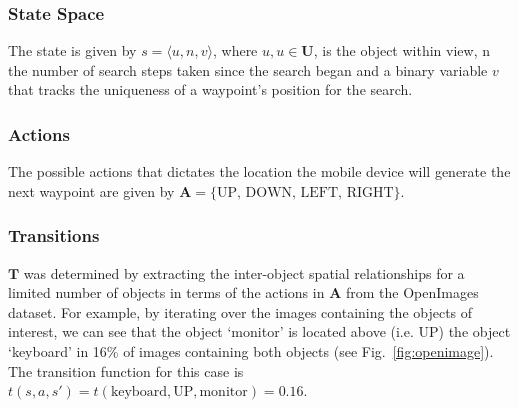 \documentclass[runningheads]{llncs}
\begin{document}


\subsubsection{State Space}

The state is given by $s = \langle u, n, v \rangle$, where $u, u\in\mathbf{U}$, is the object within view, n the number of search steps taken since the search began and a binary variable $v$ that tracks the uniqueness of a waypoint's position for the search.

\subsubsection{Actions}

The possible actions that dictates the location the mobile device will generate the next waypoint are given by $\mathbf{A} = \{ \textrm{UP, DOWN, LEFT, RIGHT} \}$.

\subsubsection{Transitions}

$\mathbf{T}$ was determined by extracting the inter-object spatial relationships for a limited number of objects in terms of the actions in $\mathbf{A}$ from the OpenImages~\cite{openimages} dataset. 
For example, by iterating over the images containing the objects of interest, we can see that the object `monitor' is located above (i.e. UP) the object `keyboard' in 16\% of images containing both objects (see Fig.~\ref{fig:openimage}). 
The transition function for this case is $t(s, a, s') = t(\textrm{keyboard}, \textrm{UP}, \textrm{monitor}) = 0.16$.

\end{document}

